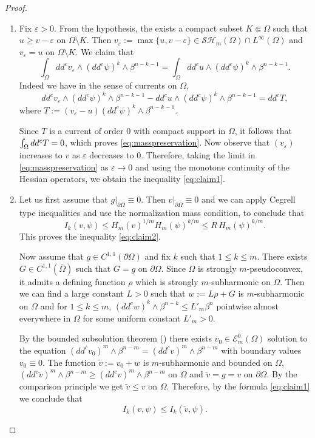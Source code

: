 \documentclass[11pt]{article}
\newcommand{\skpt}{\smallskip}
\numberwithin{equation}{section}
\theoremstyle{definition}
\theoremstyle{plain}
\theoremstyle{definition}
\begin{document}
\skpt
\begin{proof}
\begin{enumerate}
\item
Fix $\varepsilon > 0$. From the hypothesis, the exists a compact subset $K \Subset \Omega$ such that $ u \geq v - \varepsilon$ on $\Omega \setminus K$. Then $v_\varepsilon := \max \{u,v-\varepsilon\} \in \mathcal{SH}_m (\Omega) \cap L^{\infty} (\Omega)$ and $v_\varepsilon = u$ on $\Omega \setminus K$.
We claim that
\begin{equation} \label{eq:masspreservation}
\int_{\Omega} dd^c v_\varepsilon \wedge (dd^c \psi)^{k} \wedge\beta^{n-k-1} = \int_{\Omega} dd^c u \wedge (dd^c \psi)^k \wedge\beta^{n-k-1}.
\end{equation}
Indeed we have in the sense of currents on $\Omega$,
\[
dd^c v_\varepsilon \wedge (dd^c \psi)^{k} \wedge\beta^{n-k-1} - dd^c u \wedge (dd^c \psi)^k \wedge\beta^{n-k-1} = dd^c T,
\]
where $T := (v_\varepsilon - u) (dd^c \psi)^k \wedge\beta^{n-k-1}$.

Since $T$ is a current of order $0$ with compact support in $\Omega$, it follows that $\int_\Omega dd^c T =\nobreak 0$, which proves \eqref{eq:masspreservation}.
Now observe that $(v_\varepsilon)$ increases to $v$ as $\varepsilon$ decreases to $0$. Therefore, taking the limit in \eqref{eq:masspreservation} as $\varepsilon \to 0$ and using the monotone continuity of the Hessian operators, we obtain the inequality \eqref{eq:claim1}.

\item
Let us first assume that $g|_{\partial \Omega} \equiv 0$. Then $v|_{\partial \Omega} \equiv 0$ and we can apply Cegrell type inequalities \cite[Lem.\,2.8]{BZ20} and use the normalization mass condition, to conclude that
\[
I_k(v,\psi) \leq H_m (v)^{1\slash m} H_m (\psi)^{k \slash m}
\leq  R \, H_m (\psi)^{k \slash m}.
\]
This proves the inequality \eqref{eq:claim2}.

Now assume that $g \in C^{1,1} (\partial \Omega)$ and fix $k$ such that $1 \leq k \leq m$.
There exists $G \in C^{1,1} (\bar{\Omega})$ such that $G = g$ on $\partial \Omega$. Since $\Omega$ is strongly $m$-pseudoconvex, it admits a defining function $\rho$ which is strongly $m$-subharmonic on $\Omega$. Then we can find a large constant $L > 0$ such that $w := L \rho + G$ is $m$-subharmonic on $\Omega$ and for $1 \leq k \leq m$, $(dd^c w)^k \wedge \beta^{n-k} \leq L'_m \beta^n$ pointwise almost everywhere in $\Omega$ for some uniform constant $L'_m > 0$.

By the bounded subsolution theorem (\cite{N13}) there exists $v_0 \in \mathcal{E}^0_m (\Omega)$ solution to the equation $(dd^c v_0)^m \wedge \beta^{n-m} = (dd^c v)^m \wedge \beta^{n-m}$ with boundary values $v_0 \equiv 0$.
The function $\tilde v := v_0 + w$ is $m$-subharmonic and bounded on $\Omega$, $(dd^c \tilde v)^m \wedge \beta^{n-m} \geq (dd^c v)^m \wedge \beta^{n-m} $ on $\Omega$ and $ \tilde v = g = v$ on $\partial \Omega$. By the comparison principle we get $\tilde v \leq v$ on $\Omega$.
Therefore, by the formula \eqref{eq:claim1} we conclude that
\[
I_k (v,\psi) \leq I_k (\tilde v,\psi).
\]


\end{enumerate}
\end{proof}
\end{document}
